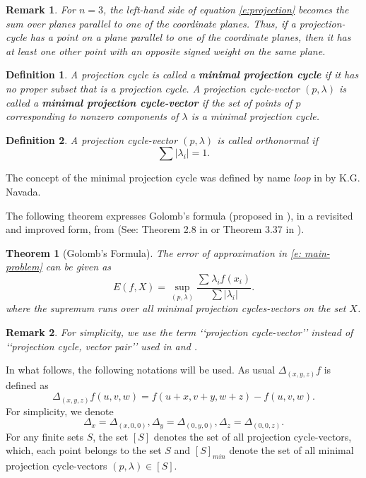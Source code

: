\documentclass[12p]{article}
\numberwithin{equation}{section}
\newtheorem{theorem}{Theorem}[section]
\newtheorem{definition}{Definition}[section]
\newtheorem{remark}{Remark}[section]
\begin{document}
\begin{remark}
    For \(n=3\), the left-hand side of equation \eqref{e:projection} becomes the sum over planes parallel to one of the coordinate planes. Thus, if a projection-cycle has a point on a plane parallel to one of the coordinate planes, then it has at least one other point with an opposite signed weight on the same plane.
\end{remark}
\begin{definition}
    A projection cycle is called a \textbf{minimal projection cycle} if it has no proper subset that is a projection cycle. A projection cycle-vector \((p,\lambda)\) is called a \textbf{minimal projection cycle-vector} if the set of points of \(p\) corresponding to nonzero components of \(\lambda\) is a minimal projection cycle.
\end{definition}
\begin{definition}
    A projection cycle-vector \((p,\lambda)\) is called orthonormal if
\[     \sum|\lambda_i|=1.    \]
\end{definition}

The concept of the minimal projection cycle was defined by name \textit{loop} in \cite{Navada} by K.G. Navada.

The following theorem expresses Golomb's formula (proposed in \cite{Golomb}), in a revisited and improved form, from \cite{Ismailov_2009} (See: Theorem 2.8 in \cite{Ismailov_2009} or Theorem 3.37 in \cite{Ismailov_2021}).
\begin{theorem}[Golomb's Formula] The error of approximation in \eqref{e: main-problem} can be given as 
    \begin{equation} \label{e:Golomb}
   E(f,X)=\sup_{(p,\lambda)} \frac{\sum_{}\lambda_if(x_i)}{\sum|\lambda_i|}. 
\end{equation}
where the supremum runs over all minimal projection cycles-vectors on the set \(X\).
\end{theorem}
\begin{remark}
    For simplicity, we use the term ‘‘projection cycle-vector’’ instead of ‘‘projection cycle, vector pair’’ used in \cite{Ismailov_2009} and \cite{Ismailov_2021}.
\end{remark}
In what follows, the following notations will be used.
As usual \(\Delta_{(x,y,z)} f\) is defined as
\[
\Delta_{(x,y,z)} f(u,v,w)= f(u+x,v+y,w+z)-f(u,v,w).
\]
For simplicity, we denote
\[
\Delta_x=\Delta_{(x,0,0)}, \Delta_y=\Delta_{(0,y,0)},\Delta_z=\Delta_{(0,0,z)}.
\]
For any finite sets \(S\), the set \([S]\) denotes the set of all projection cycle-vectors, which, each point belongs to the set \(S\) and \([S]_{min}\) denote the set of all minimal projection cycle-vectors \((p,\lambda) \in [S]\).
\end{document}
